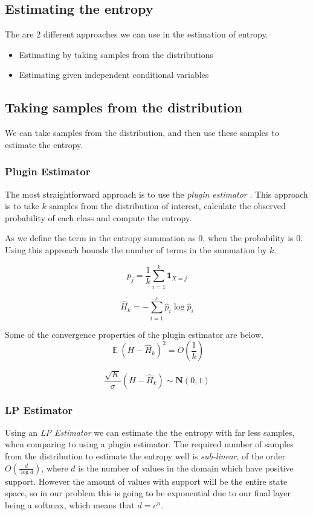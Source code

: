 \documentclass[12pt, a4paper]{report}
\theoremstyle{definition}
\theoremstyle{definition}
\theoremstyle{definition}
\DeclareMathOperator{\E}{\mathbb{E}}
\begin{document}
\subsection{Estimating the entropy}

The are 2 different approaches we can use in the estimation of entropy.

\begin{itemize}
    \item Estimating by taking samples from the distributions
    \item Estimating given independent conditional variables
\end{itemize}



\subsection{Taking samples from the distribution}

We can take samples from the distribution, and then use these samples to estimate the entropy.


\subsubsection{Plugin Estimator}
The most straightforward approach is to use the \textit{plugin estimator} \cite{van2000asymptotic}. This approach is to take $k$ samples from the distribution of interest, calculate the observed probability of each class and compute the entropy.

As we define the term in the entropy summation as $0$, when the probability is $0$. Using this approach bounds the number of terms in the summation by $k$.

$$p_j = \frac{1}{k} \sum_{i=1}^k \mathbf{1}_{X = j} $$

$$\hat{H}_k = - \sum_{i=1}^{c} \hat{p}_i \log{\hat{p}_i}$$


Some of the convergence properties of the plugin estimator are below.
$$\E \left(H - \hat{H}_k \right)^2 = O \left ( \frac{1}{k} \right) $$

$$ \frac{\sqrt{K}}{\sigma} \left(H - \hat{H}_k \right) \sim \mathbf{N} \left(0, 1 \right) $$



\subsubsection{LP Estimator}

Using an \textit{LP Estimator} \cite{} we can estimate the the entropy with far less samples, when comparing to using a plugin estimator. The required number of samples from the distribution to estimate the entropy well is \textit{sub-linear}, of the order $O \left( \frac{d}{\log{d}}\right)$, where $d$ is the number of values in the domain which have positive support. However the amount of values with support will be the entire state space, so in our problem this is going to be exponential due to our final layer being a softmax, which means that $d = c^n$.
\end{document}
